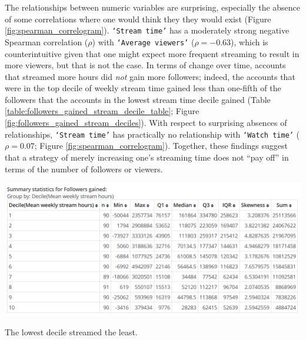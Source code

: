 \documentclass[12pt]{article}
\begin{document}
The relationships between numeric variables are surprising, especially the absence of some correlations where one would think they they would exist (Figure \ref{fig:spearman_correlogram}). \texttt{`Stream time’} has a moderately strong negative Spearman correlation ($\rho$) with \texttt{`Average viewers’} ($\rho = -0.63$), which is counterintuitive given that one might expect more frequent streaming to result in more viewers, but that is not the case. In terms of change over time, accounts that streamed more hours did \emph{not} gain more followers; indeed, the accounts that were in the top decile of weekly stream time gained less than one-fifth of the followers that the accounts in the lowest stream time decile gained (Table \ref{table:followers_gained_stream_decile_table}; Figure \ref{fig:followers_gained_stream_deciles}).  With respect to surprising absences of relationships, \texttt{`Stream time’} has practically no relationship with \texttt{`Watch time’} ($\rho = 0.07$; Figure \ref{fig:spearman_correlogram}). Together, these findings suggest that a strategy of merely increasing one’s streaming time does not “pay off” in terms of the number of followers or viewers.

\begin{table}[ht]
  \centering
  \includegraphics[width=\linewidth]{../StatCrunch_Results/followers_gained_stream_decile_table}
  \captionsetup{justification=centering, singlelinecheck=false, margin=2cm}
  \caption[Followers Gained by Stream Time Deciles]{The lowest decile streamed the least.}
  \label{table:followers_gained_stream_decile_table}
\end{table}
\end{document}
